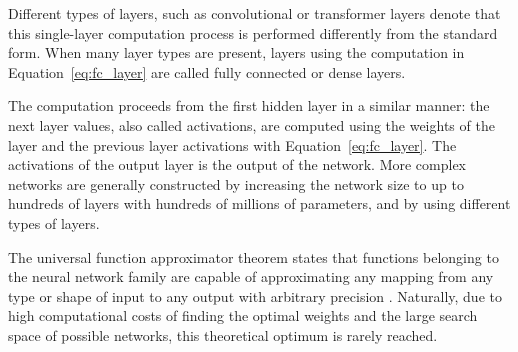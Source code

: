 \documentclass{article}
\begin{document}
Different types of layers, such as convolutional or transformer layers 
denote that this single-layer computation process is performed differently from 
the standard form. When many layer types are present, layers using the computation
in Equation~\ref{eq:fc_layer} are called fully connected or dense layers.

The computation proceeds from the first hidden layer in a similar manner: 
the next layer values, also called activations, are computed using the weights of 
the layer and the previous layer activations with Equation~\ref{eq:fc_layer}.
The activations of the output layer is the output of the network.
More complex networks are generally constructed by increasing the network size to up to 
hundreds of layers with hundreds of millions of parameters, and by using
different types of layers.

The universal function approximator theorem states that functions belonging to the 
neural network family are capable of approximating any mapping from any type or shape of input
to any output with arbitrary precision \cite{princebook}. Naturally, due to high computational 
costs of finding the optimal weights and the large search space of possible networks, 
this theoretical optimum is rarely reached.
\end{document}

